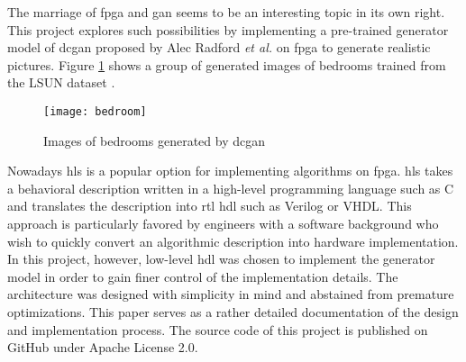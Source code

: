 The marriage of \gls{fpga} and \gls{gan} seems to be an interesting topic in its own right. This project
explores such possibilities by implementing a pre-trained generator model of \gls{dcgan} proposed by
Alec Radford \textit{et al.} \cite{radford:conv_gan} on \gls{fpga} to generate realistic pictures.
Figure \ref{fig:bedroom} shows a group of generated images of bedrooms trained from the LSUN dataset
\cite{yu15lsun}.

\begin{figure}[h]
  \centering
  \texttt{[image: bedroom]}
  \caption{Images of bedrooms generated by \gls{dcgan} \cite{radford:conv_gan}}
  \label{fig:bedroom}
\end{figure}

Nowadays \gls{hls} is a popular option for implementing algorithms on \gls{fpga}. \gls{hls} takes a
behavioral description written in a high-level programming language such as C and translates the description
into \gls{rtl} \gls{hdl} such as Verilog or VHDL. This approach is particularly favored by engineers with
a software background who wish to quickly convert an algorithmic description into hardware implementation.
In this project, however, low-level \gls{hdl} was chosen to implement the generator model in order to gain
finer control of the implementation details. The architecture was designed with simplicity in mind and
abstained from premature optimizations. This paper serves as a rather detailed documentation of the design and
implementation process. The source code of this project is published on GitHub \cite{github:dcgan_fpga} under
Apache License 2.0.

\clearpage %
